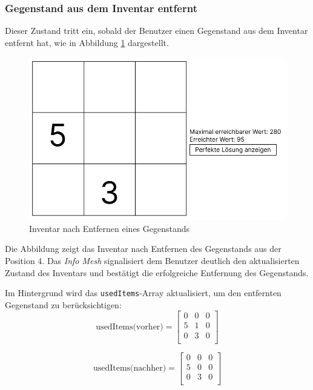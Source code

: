 \subsubsection*{Gegenstand aus dem Inventar entfernt}
Dieser Zustand tritt ein, sobald der Benutzer einen Gegenstand aus dem Inventar entfernt hat, wie in Abbildung
\ref{fig:controller_itemRemoved} dargestellt.


\begin{figure}[H]
\centering
\includegraphics[scale=0.5]{images/itemEntfernt}
\caption{Inventar nach Entfernen eines Gegenstands}
\label{fig:controller_itemRemoved}
\end{figure}

Die Abbildung zeigt das Inventar nach Entfernen des Gegenstands aus der Position 4. Das \textit{Info Mesh} signalisiert
dem Benutzer deutlich den aktualisierten Zustand des Inventars und bestätigt die erfolgreiche Entfernung des Gegenstands.

Im Hintergrund wird das \texttt{usedItems}-Array aktualisiert, um den entfernten Gegenstand zu berücksichtigen:
\[
\text{usedItems(vorher)} =
\left[
\begin{array}{ccccc}
0 & 0 & 0 \\
5 & 1 & 0 \\
0 & 3 & 0 \\
\end{array}
\right]
\]

\[
\text{usedItems(nachher)} =
\left[
\begin{array}{ccccc}
0 & 0 & 0 \\
5 & 0 & 0 \\
0 & 3 & 0 \\
\end{array}
\right]
\]

